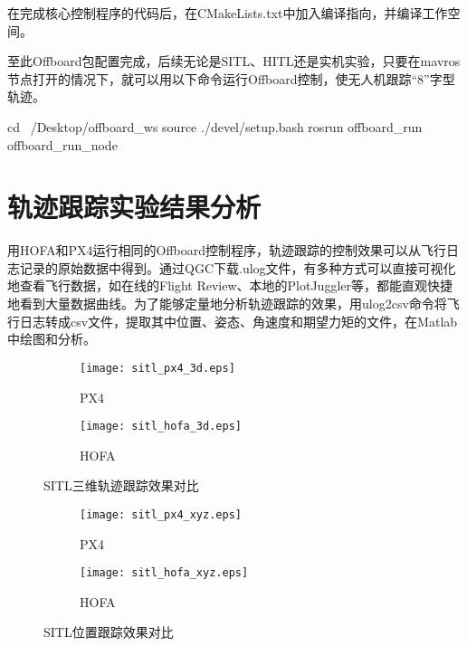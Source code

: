 在完成核心控制程序的代码后，在CMakeLists.txt中加入编译指向，并编译工作空间。
至此Offboard包配置完成，后续无论是SITL、HITL还是实机实验，只要在mavros节点打开的情况下，就可以用以下命令运行Offboard控制，使无人机跟踪“8”字型轨迹。
\begin{codeblock}[language=C]
  cd ~/Desktop/offboard_ws
  source ./devel/setup.bash
  rosrun offboard_run offboard_run_node
\end{codeblock}


\section{轨迹跟踪实验结果分析}
用HOFA和PX4运行相同的Offboard控制程序，轨迹跟踪的控制效果可以从飞行日志记录的原始数据中得到。通过QGC下载.ulog文件，有多种方式可以直接可视化地查看飞行数据，如在线的Flight Review、本地的PlotJuggler等，都能直观快捷地看到大量数据曲线。为了能够定量地分析轨迹跟踪的效果，用ulog2csv命令将飞行日志转成csv文件，提取其中位置、姿态、角速度和期望力矩的文件，在Matlab中绘图和分析。

\begin{figure}[H]
  \centering
  \begin{subfigure}[b]{0.49\linewidth}
      \texttt{[image: sitl\_px4\_3d.eps]}
      \caption{PX4}
  \end{subfigure}
  \hfill %
  \begin{subfigure}[b]{0.49\linewidth}
      \texttt{[image: sitl\_hofa\_3d.eps]}
      \caption{HOFA}
  \end{subfigure}
  \caption{SITL三维轨迹跟踪效果对比}
  \label{SITL三维轨迹跟踪效果对比}
\end{figure}
  \begin{figure}[H]
    \centering
  \begin{subfigure}[b]{0.49\linewidth}
      \texttt{[image: sitl\_px4\_xyz.eps]}
      \caption{PX4}
  \end{subfigure}
  \hfill
  \begin{subfigure}[b]{0.49\linewidth}
      \texttt{[image: sitl\_hofa\_xyz.eps]}
      \caption{HOFA}
  \end{subfigure}
  \caption{SITL位置跟踪效果对比}
  \label{SITL位置跟踪效果对比}
\end{figure}

